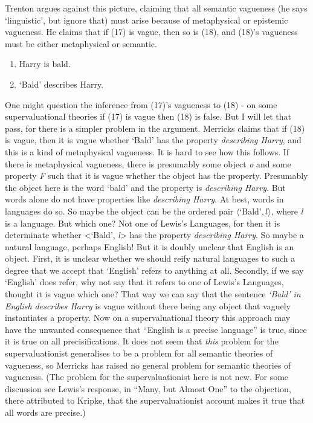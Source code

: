 Trenton \citet{Merricks2001} argues against this picture, claiming that all semantic vagueness (he says `linguistic', but ignore that) must arise because of metaphysical or epistemic vagueness. He claims that if (17) is vague, then so is (18), and (18)'s vagueness must be either metaphysical or semantic.

\begin{enumerate}
\renewcommand{\labelenumi}{(\arabic{enumi})}
\setcounter{enumi}{16}
\item Harry is bald.
\item `Bald' describes Harry.
\end{enumerate}

\noindent One might question the inference from (17)'s vagueness to (18) - on some supervaluational theories if (17) is vague then (18) is false. But I will let that pass, for there is a simpler problem in the argument. Merricks claims that if (18) is vague, then it is vague whether `Bald' has the property \textit{describing Harry}, and this is a kind of metaphysical vagueness. It is hard to see how this follows. If there is metaphysical vagueness, there is presumably some object \textit{o} and some property \textit{F} such that it is vague whether the object has the property. Presumably the object here is the word `bald' and the property is \textit{describing Harry}. But words alone do not have properties like \textit{describing Harry}. At best, words in languages do so. So maybe the object can be the ordered pair \(\langle \text{`Bald'}, l \rangle\), where \textit{l} is a language. But which one? Not one of Lewis's Languages, for then it is determinate whether {\textless}`Bald', \textit{l}{\textgreater} has the property \textit{describing Harry}. So maybe a natural language, perhaps English! But it is doubly unclear that English is an object. First, it is unclear whether we should reify natural languages to such a degree that we accept that `English' refers to anything at all. Secondly, if we say `English' does refer, why not say that it refers to one of Lewis's Languages, thought it is vague which one? That way we can say that the sentence \textit{`Bald' in English describes Harry} is vague without there being any object that vaguely instantiates a property. Now on a supervaluational theory this approach may have the unwanted consequence that ``English is a precise language'' is true, since it is true on all precisifications. It does not seem that \textit{this} problem for the supervaluationist generalises to be a problem for all semantic theories of vagueness, so Merricks has raised no general problem for semantic theories of vagueness. (The problem for the supervaluationist here is not new. For some discussion see Lewis's response, in ``Many, but Almost One'' to the objection, there attributed to Kripke, that the supervaluationist account makes it true that all words are precise.)

